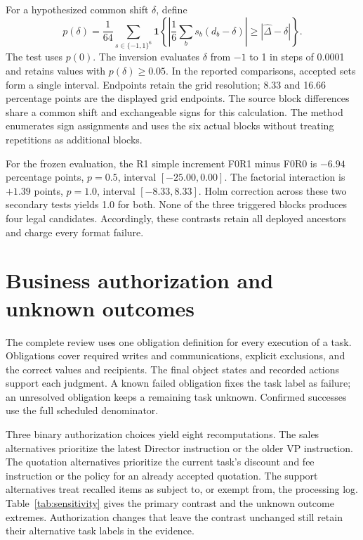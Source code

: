 \documentclass{ecai}
\begin{document}
For a hypothesized common shift $\delta$, define
\begin{equation}
p(\delta)=\frac{1}{64}\sum_{s\in\{-1,1\}^{6}}
\mathbf 1\!\left\{
\left|\frac{1}{6}\sum_b s_b(d_b-\delta)\right|
\geq |\widehat\Delta-\delta|
\right\}.
\end{equation}
The test uses $p(0)$. The inversion evaluates $\delta$ from $-1$ to 1 in steps of 0.0001 and retains values with $p(\delta)\geq0.05$. In the reported comparisons, accepted sets form a single interval. Endpoints retain the grid resolution; 8.33 and 16.66 percentage points are the displayed grid endpoints. The source block differences share a common shift and exchangeable signs for this calculation. The method enumerates sign assignments and uses the six actual blocks without treating repetitions as additional blocks.

For the frozen evaluation, the R1 simple increment F0R1 minus F0R0 is $-6.94$ percentage points, $p=0.5$, interval $[-25.00,0.00]$. The factorial interaction is $+1.39$ points, $p=1.0$, interval $[-8.33,8.33]$. Holm correction across these two secondary tests yields 1.0 for both. None of the three triggered blocks produces four legal candidates. Accordingly, these contrasts retain all deployed ancestors and charge every format failure.

\section{Business authorization and unknown outcomes}

The complete review uses one obligation definition for every execution of a task. Obligations cover required writes and communications, explicit exclusions, and the correct values and recipients. The final object states and recorded actions support each judgment. A known failed obligation fixes the task label as failure; an unresolved obligation keeps a remaining task unknown. Confirmed successes use the full scheduled denominator.

Three binary authorization choices yield eight recomputations. The sales alternatives prioritize the latest Director instruction or the older VP instruction. The quotation alternatives prioritize the current task's discount and fee instruction or the policy for an already accepted quotation. The support alternatives treat recalled items as subject to, or exempt from, the processing log. Table~\ref{tab:sensitivity} gives the primary contrast and the unknown outcome extremes. Authorization changes that leave the contrast unchanged still retain their alternative task labels in the evidence.
\end{document}

